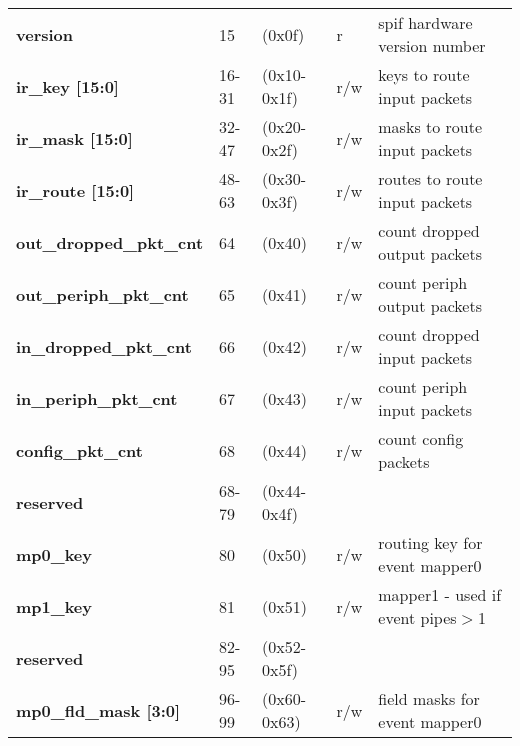 \documentclass[11pt,a4paper,twoside]{article}
\begin{document}
\begin{center}
\begin{table}[!h]
\begin{tabularx}{\textwidth}{| p{37mm} p{13mm} p{21mm} p{6mm} X |}
		\textbf{version}                     & 15                         & (0x0f)                         & r                   & spif hardware version number \\%
		\textbf{ir\_key [15:0]}              & 16-31                      & (0x10-0x1f)                    & r/w                 & keys to route input packets \\%
		\textbf{ir\_mask [15:0]}             & 32-47                      & (0x20-0x2f)                    & r/w                 & masks to route input packets \\%
		\textbf{ir\_route [15:0]}            & 48-63                      & (0x30-0x3f)                    & r/w                 & routes to route input packets \\%
		\textbf{out\_dropped\_pkt\_cnt}      & 64                         & (0x40)                         & r/w                 & count dropped output packets\\%
		\textbf{out\_periph\_pkt\_cnt}       & 65                         & (0x41)                         & r/w                 & count periph output packets\\%
		\textbf{in\_dropped\_pkt\_cnt}       & 66                         & (0x42)                         & r/w                 & count dropped input packets \\%
		\textbf{in\_periph\_pkt\_cnt}        & 67                         & (0x43)                         & r/w                 & count periph input packets\\%
		\textbf{config\_pkt\_cnt}            & 68                         & (0x44)                         & r/w                 & count config packets \\%
		\cellcolor{gray!25}\textbf{reserved} & \cellcolor{gray!25}68-79   & \cellcolor{gray!25}(0x44-0x4f) & \cellcolor{gray!25} & \cellcolor{gray!25}\\%
		\textbf{mp0\_key}                    & 80                         & (0x50)                         & r/w                 & routing key for event mapper0 \\%
		\textbf{mp1\_key}                    & 81                         & (0x51)                         & r/w                 & mapper1 - used if event pipes$>$1 \\%
		\cellcolor{gray!25}\textbf{reserved} & \cellcolor{gray!25}82-95   & \cellcolor{gray!25}(0x52-0x5f) & \cellcolor{gray!25} & \cellcolor{gray!25}\\%
		\textbf{mp0\_fld\_mask [3:0]}        & 96-99                      & (0x60-0x63)                    & r/w                 & field masks for event mapper0 \\%

\end{tabularx}
\end{table}
\end{center}
\end{document}
